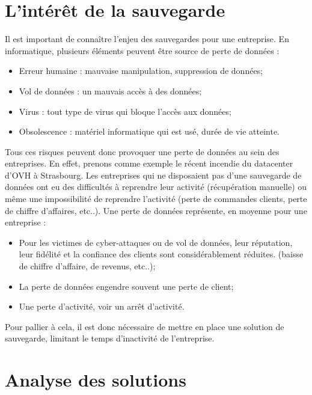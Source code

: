 \documentclass[pfe]{tnreport} %
\begin{document}
\section{L'intérêt de la sauvegarde}

Il est important de connaître l'enjeu des sauvegardes pour une entreprise. En informatique, plusieurs éléments peuvent être source de perte de données : \newline
\begin{itemize}
 \item Erreur humaine : mauvaise manipulation, suppression de données;
 \item Vol de données : un mauvais accès à des données;
 \item Virus : tout type de virus qui bloque l'accès aux données;
 \item Obsolescence : matériel informatique qui est usé, durée de vie atteinte. \newline
\end{itemize} 

Tous ces risques peuvent donc provoquer une perte de données au sein des entreprises. 
En effet, prenons comme exemple le récent incendie du datacenter d'OVH à Strasbourg. Les entreprises qui ne disposaient pas d'une sauvegarde de données ont eu des difficultés à reprendre leur activité (récupération manuelle) ou même une impossibilité de reprendre l'activité (perte de commandes clients, perte de chiffre d'affaires, etc..). 
Une perte de données représente, en moyenne pour une entreprise : \newline
\begin{itemize}
 \item Pour les victimes de cyber-attaques ou de vol de données, leur réputation, leur fidélité et la confiance des clients sont considérablement réduites. (baisse de chiffre d'affaire, de revenus, etc..);
 \item La perte de données engendre souvent une perte de client;
 \item Une perte d'activité, voir un arrêt d'activité.\newline
\end{itemize} 

Pour pallier à cela, il est donc nécessaire de mettre en place une solution de sauvegarde, limitant le temps d'inactivité de l'entreprise.

\section{Analyse des solutions}
\end{document}
